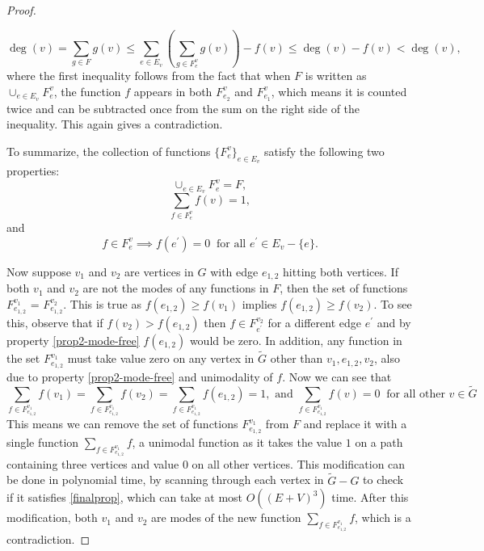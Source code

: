 \documentclass[11pt]{article}
\begin{document}
\begin{proof}
\begin{itemize}
	\[
		\deg(v) = \sum_{g \in F} g(v) \leq \sum_{e \in E_v} \left( \sum_{g \in F^{v}_{e}} g(v) \right)  - f(v) \leq \deg(v) - f(v) < \deg(v),
	\]
	where the first inequality follows from the fact that when $F$ is written as $\cup_{e \in E_v} F^{v}_{e}$, the function $f$ appears in both $F^v_{e_2}$ and $F^v_{e_1}$, which means it is counted twice and can be subtracted once from the sum on the right side of the inequality. This again gives a contradiction.
\end{itemize}
To summarize, the collection of functions $\{ F^{v}_{e} \}_{e \in E_v}$ satisfy the following two properties:
\begin{equation}
\label{prop1-mode-free}
\cup_{e \in E_v} F^{v}_{e} = F,
\end{equation}
\begin{equation}
\label{prop3-mode-free}
\sum_{f \in F^{v}_{e}} f(v) = 1,
\end{equation}
and
\begin{equation}
\label{prop2-mode-free}
f \in F^{v}_{e} \implies f(e^{'}) = 0 \ \text{ for all $e^{'} \in E_v - \{e\}$}.
\end{equation}

Now suppose $v_1$ and $v_2$ are vertices in $G$ with edge $e_{1,2}$ hitting both vertices. If both $v_1$ and $v_2$ are not the modes of any functions in $F$, then the set of functions $F^{v_1}_{e_{1,2}}$ = $F^{v_2}_{e_{1,2}} $. This is true as $f(e_{1,2}) \geq f(v_1)$ implies $f(e_{1,2}) \geq f(v_2)$. To see this, observe that if $f(v_2) > f(e_{1,2})$ then $f \in F^{v_2}_{e^{'}}$ for a different edge $e^{'}$ and by property \eqref{prop2-mode-free} $f(e_{1,2})$ would be zero. 
In addition, any function in the set $F^{v_1}_{e_{1,2}}$ must take value zero on any vertex in $\tilde{G}$ other than $v_1, e_{1,2}, v_2$, also due to property \eqref{prop2-mode-free} and unimodality of $f$. Now we can see that
\begin{equation}
\label{finalprop}
	\sum_{f \in F^{v_1}_{e_{1,2}}} f(v_1) = \sum_{f \in F^{v_1}_{e_{1,2}}} f(v_2) = \sum_{f \in F^{v_1}_{e_{1,2}}} f(e_{1,2}) = 1, \text{ \ and \ } \sum_{f \in F^{v_1}_{e_{1,2}}} f(v) = 0 \ \text{ for all other $v \in \tilde{G}$} 
\end{equation}
This means we can remove the set of functions $F^{v_1}_{e_{1,2}}$ from $F$ and replace it with a single function $\sum_{f \in F^{v_1}_{e_{1,2}}} f$, a  unimodal function as it takes the value $1$ on a path containing three vertices and value $0$ on all other vertices. This modification can be done in polynomial time, by scanning through each vertex in $\tilde{G}-G$ to check if it satisfies \eqref{finalprop}, which can take at most $O((E + V)^3)$ time. After this modification, both $v_1$ and $v_2$ are modes of the new function $\sum_{f \in F^{v_1}_{e_{1,2}}} f$, which is a contradiction.
\end{proof}
\end{document}
